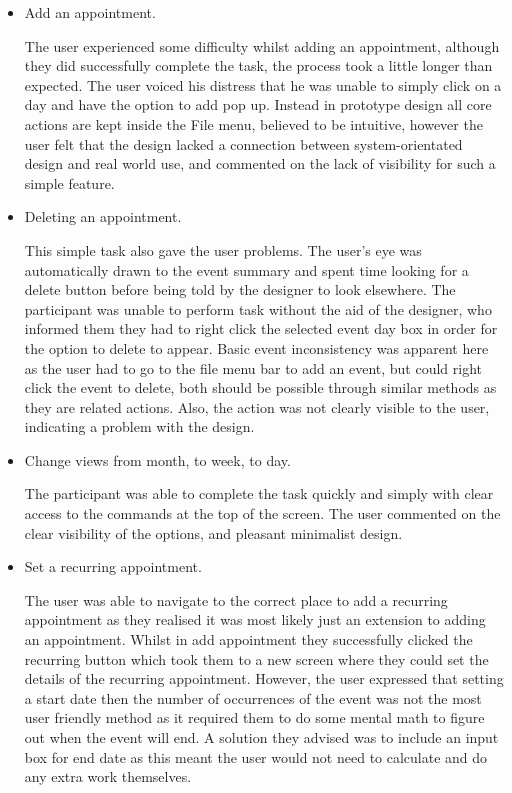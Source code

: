 \documentclass{article}
\begin{document}
\begin{itemize}
\item Add an appointment.

The user experienced some difficulty whilst adding an appointment,
although they did successfully complete the task, the process took a
little longer than expected. The user voiced his distress that he was
unable to simply click on a day and have the option to add pop up.
Instead in prototype design all core actions are kept inside the
File menu, believed to be intuitive, however the user felt that
the design lacked a connection between system-orientated design and
real world use, and commented on the lack of visibility for such a
simple feature.

\item Deleting an appointment.

This simple task also gave the user problems. The user's eye was
automatically drawn to the event summary and spent time looking for a
delete button before being told by the designer to look elsewhere.
The participant was unable to perform task without the aid of the
designer, who informed them they had to right click the selected event
day box in order for the option to delete to appear. Basic event
inconsistency was apparent here as the user had to go to the file menu
bar to add an event, but could right click the event to delete, both
should be possible through similar methods as they are related actions.
Also, the action was not clearly visible to the user, indicating a
problem with the design.

\item Change views from month, to week, to day.

The participant was able to complete the task quickly and simply with
clear access to the commands at the top of the screen. The user
commented on the clear visibility of the options, and pleasant
minimalist design.

\item Set a recurring appointment.

The user was able to navigate to the correct place to add a recurring
appointment as they realised it was most likely just an extension to
adding an appointment. Whilst in add appointment they successfully
clicked the recurring button which took them to a new screen where they
could set the details of the recurring appointment. However, the user
expressed that setting a start date then the number of occurrences of
the event was not the most user friendly method as it required them to
do some mental math to figure out when the event will end. A solution
they advised was to include an input box for end date as this meant 
the user would not need to calculate and do any extra work themselves.


\end{itemize}
\end{document}
